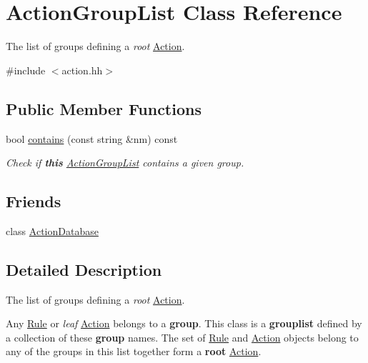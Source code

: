 \hypertarget{class_action_group_list}{}\section{Action\+Group\+List Class Reference}
\label{class_action_group_list}


The list of groups defining a {\itshape root} \mbox{\hyperlink{class_action}{Action}}.  




{\ttfamily \#include $<$action.\+hh$>$}

\subsection*{Public Member Functions}
\begin{DoxyCompactItemize}
\item 
bool \mbox{\hyperlink{class_action_group_list_a1da632f21f5671ecabc3c0551e787041}{contains}} (const string \&nm) const
\begin{DoxyCompactList}\small\item\em Check if {\bfseries{this}} \mbox{\hyperlink{class_action_group_list}{Action\+Group\+List}} contains a given group. \end{DoxyCompactList}\end{DoxyCompactItemize}
\subsection*{Friends}
\begin{DoxyCompactItemize}
\item 
class \mbox{\hyperlink{class_action_group_list_ab2339bb3393a889e3deb566638006958}{Action\+Database}}
\end{DoxyCompactItemize}


\subsection{Detailed Description}
The list of groups defining a {\itshape root} \mbox{\hyperlink{class_action}{Action}}. 

Any \mbox{\hyperlink{class_rule}{Rule}} or {\itshape leaf} \mbox{\hyperlink{class_action}{Action}} belongs to a {\bfseries{group}}. This class is a {\bfseries{grouplist}} defined by a collection of these {\bfseries{group}} names. The set of \mbox{\hyperlink{class_rule}{Rule}} and \mbox{\hyperlink{class_action}{Action}} objects belong to any of the groups in this list together form a {\bfseries{root}} \mbox{\hyperlink{class_action}{Action}}. 

